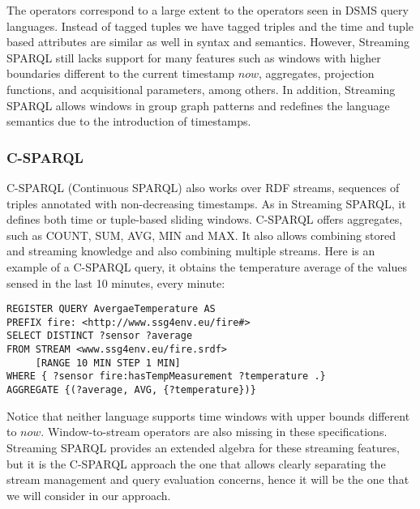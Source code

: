 The operators correspond to a large extent to the operators seen in DSMS query languages. %
Instead of tagged tuples we have tagged triples and the time and tuple based attributes are similar as well in syntax
and semantics. However, Streaming SPARQL still lacks support for many features such as windows with higher boundaries
different to the current timestamp $now$, aggregates, projection functions, and acquisitional parameters, among others.
In addition, Streaming SPARQL allows windows in group graph patterns and redefines the language semantics due to the
introduction of timestamps.

\subsubsection{C-SPARQL} C-SPARQL (Continuous SPARQL) \cite{Barbieri_2010} also works over RDF streams, sequences of triples annotated with non-decreasing timestamps. As in Streaming SPARQL, it defines both time or tuple-based sliding windows. C-SPARQL offers aggregates, such as \textsf{COUNT, SUM, AVG, MIN} and \textsf{MAX}. It also allows combining stored and streaming knowledge and also combining multiple streams. Here is an example of a C-SPARQL query, it obtains the temperature average of the values sensed in the last 10 minutes, every minute:

\begin{lstlisting}[style=SPARQLSTRStyle,language=SPARQLSTR,frame=none]
REGISTER QUERY AvergaeTemperature AS
PREFIX fire: <http://www.ssg4env.eu/fire#>
SELECT DISTINCT ?sensor ?average
FROM STREAM <www.ssg4env.eu/fire.srdf> 
     [RANGE 10 MIN STEP 1 MIN]
WHERE { ?sensor fire:hasTempMeasurement ?temperature .}
AGGREGATE {(?average, AVG, {?temperature})}
\end{lstlisting}

Notice that neither language supports time windows with upper bounds different to $now$. Window-to-stream operators are
also missing in these specifications. Streaming SPARQL provides an extended algebra for these streaming features, but
it is the C-SPARQL approach the one that allows clearly separating the stream management and query evaluation concerns,
hence it will be the one that we will consider in our approach.
